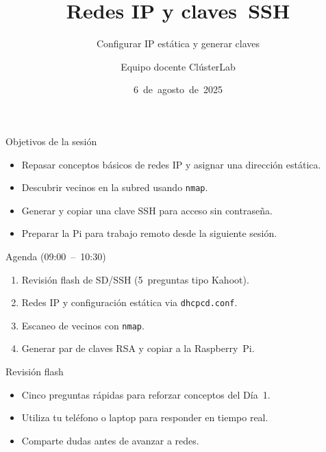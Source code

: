 \documentclass[aspectratio=169,professionalfonts]{beamer}
\title[ClústerLab • Día 2]{Redes IP y claves SSH}
\subtitle{Configurar IP estática y generar claves}
\author{Equipo docente ClústerLab}
\date{6 de agosto de 2025}
\begin{document}
\begin{frame}[plain]
  \titlepage
\end{frame}

\begin{frame}[fragile]{Objetivos de la sesión}
  \begin{itemize}
    \item Repasar conceptos básicos de redes IP y asignar una dirección estática.
    \item Descubrir vecinos en la subred usando \texttt{nmap}.
    \item Generar y copiar una clave SSH para acceso sin contraseña.
    \item Preparar la Pi para trabajo remoto desde la siguiente sesión.
  \end{itemize}
\end{frame}

\begin{frame}[fragile]{Agenda (09:00 – 10:30)}
  \begin{enumerate}
    \item Revisión flash de SD/SSH (5 preguntas tipo Kahoot).
    \item Redes IP y configuración estática via \texttt{dhcpcd.conf}.
    \item Escaneo de vecinos con \texttt{nmap}.
    \item Generar par de claves RSA y copiar a la Raspberry Pi.
  \end{enumerate}
\end{frame}

\begin{frame}[fragile]{Revisión flash}
  \begin{itemize}
    \item Cinco preguntas rápidas para reforzar conceptos del Día 1.
    \item Utiliza tu teléfono o laptop para responder en tiempo real.
    \item Comparte dudas antes de avanzar a redes.
  \end{itemize}
\end{frame}
\end{document}
